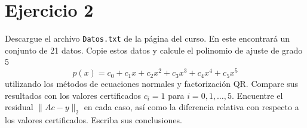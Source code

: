 
\section*{Ejercicio 2}
Descargue el archivo \texttt{Datos.txt} de la página del curso. En este encontrará un conjunto de 21 datos. Copie estos datos y calcule el polinomio de ajuste de grado 5
\[
p(x) = c_0 + c_1x + c_2x^2 + c_3x^3 + c_4x^4 + c_5x^5
\]
utilizando los métodos de ecuaciones normales y factorización QR. Compare sus resultados con los valores certificados $c_i = 1$ para $i = 0, 1, \dots, 5$. Encuentre el residual $\|Ac - y\|_2$ en cada caso, así como la diferencia relativa con respecto a los valores certificados. Escriba sus conclusiones.

\begin{solution}
\end{solution}